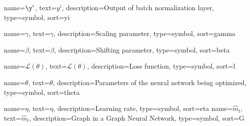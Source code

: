 {
  name={$\y^i$},
  text={\ensuremath{y^i}},
  description={Output of batch normalization layer},
  type=symbol,
  sort=yi
}

{
  name={$\gamma$},
  text={\ensuremath{\gamma}},
  description={Scaling parameter},
  type=symbol,
  sort=gamma
}

{
  name={$\beta$},
  text={\ensuremath{\beta}},
  description={Shifting parameter},
  type=symbol,
  sort=beta
}

{
  name={$\mathcal{L(\theta)}$},
  text={\ensuremath{\mathcal{L(\theta)}}},
  description={Loss function},
  type=symbol,
  sort=l
}

{
  name={$\theta$},
  text={\ensuremath{\theta}},
  description={Parameters of the neural network being optimized},
  type=symbol,
  sort=theta
}


{
  name={$\eta$},
  text={\ensuremath{\eta}},
  description={Learning rate},
  type=symbol,
  sort=eta
}
{
  name={$\hat{m}_t$},
  text={\ensuremath{\hat{m}_t}},
  description={Graph in a Graph Neural Network},
  type=symbol,
  sort=G
}


